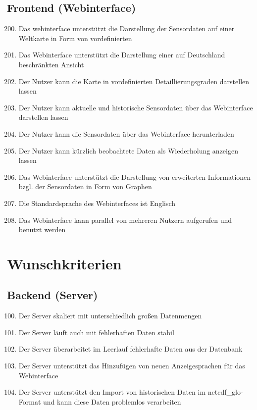 \subsection{Frontend (Webinterface)}
\begin{enumerate}[label=\textbf{MK\arabic{enumi}0}]
	\setcounter{enumi}{199}
	\item Das \gls{webinterface} unterstützt die  Darstellung der Sensordaten auf einer Weltkarte in Form von vordefinierten 
	\item Das Webinterface unterstützt die Darstellung einer auf Deutschland beschränkten Ansicht
	\item Der Nutzer kann die Karte in vordefinierten Detaillierungsgraden darstellen lassen
	\item Der Nutzer kann aktuelle und historische Sensordaten über das Webinterface darstellen lassen
	\item Der Nutzer kann die Sensordaten über das Webinterface herunterladen
	\item Der Nutzer kann kürzlich beobachtete Daten als Wiederholung anzeigen lassen
	\item Das Webinterface unterstützt die Darstellung von erweiterten Informationen bzgl. der Sensordaten in Form von Graphen
	\item Die Standardsprache des Webinterfaces ist Englisch
	\item Das Webinterface kann parallel von mehreren Nutzern aufgerufen und benutzt werden
\end{enumerate}

\section{Wunschkriterien}
\subsection{Backend (Server)}
\begin{enumerate}[label=\textbf{WK\arabic{enumi}0}]
	\setcounter{enumi}{99}
	\item Der Server skaliert mit unterschiedlich großen Datenmengen
	\item Der Server läuft auch mit fehlerhaften Daten stabil
	\item Der Server überarbeitet im Leerlauf fehlerhafte Daten aus der Datenbank
	\item Der Server unterstützt das Hinzufügen von neuen Anzeigesprachen für das Webinterface
	\item \label{NetCDF_Import}Der Server unterstützt den Import von historischen Daten im \gls{netcdf_glo}-Format und kann diese Daten problemlos verarbeiten
\end{enumerate}
